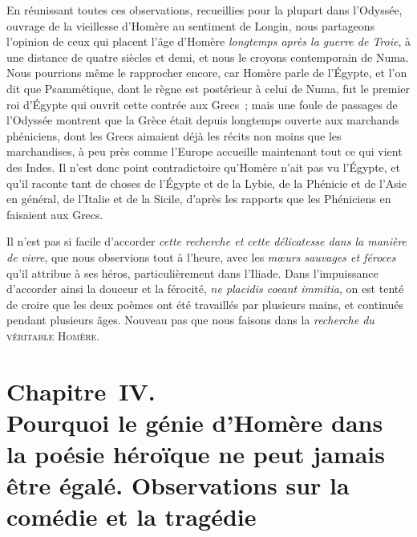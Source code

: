 \documentclass[french,twoside]{book} %
\newcommand\chapteropen{} %
\newcommand\chapterclose{} %
\begin{document}
En réunissant toutes ces observations, recueillies pour la plupart dans l’Odyssée, ouvrage de la vieillesse d’Homère au sentiment de Longin, nous partageons l’opinion de ceux qui placent l’âge d’Homère  {\itshape longtemps après la guerre de Troie}, à une distance de quatre siècles et demi, et nous le croyons contemporain de Numa. Nous pourrions même le rapprocher encore, car Homère parle de l’Égypte, et l’on dit que Psammétique, dont le règne est postérieur à celui de Numa, fut le premier roi d’Égypte qui ouvrit cette contrée aux Grecs ; mais une foule de passages de l’Odyssée montrent que la Grèce était depuis longtemps ouverte aux marchands phéniciens, dont les Grecs aimaient déjà les récits non moins que les marchandises, à peu près comme l’Europe accueille maintenant tout ce qui vient des Indes. Il n’est donc point contradictoire qu’Homère n’ait pas vu l’Égypte, et qu’il raconte tant de choses de l’Égypte et de la Lybie, de la Phénicie et de l’Asie en général, de l’Italie et de la Sicile, d’après les rapports que les Phéniciens en faisaient aux Grecs.\par
Il n’est pas si facile d’accorder {\itshape cette recherche et cette délicatesse dans la manière de vivre}, que nous observions tout à l’heure, avec les {\itshape mœurs sauvages et féroces} qu’il attribue à ses héros, particulièrement dans l’Iliade. Dans l’impuissance d’accorder ainsi la douceur et la férocité, {\itshape ne placidis coeant immitia}, on est tenté de croire que les deux poèmes ont été travaillés par plusieurs mains, et continués pendant plusieurs âges. Nouveau pas que nous faisons dans la {\itshape recherche du} {\scshape véritable Homère}.
\chapterclose


\chapteropen
\chapter[{Chapitre IV. Pourquoi le génie d’Homère dans la poésie héroïque ne peut jamais être égalé. Observations sur la comédie et la tragédie}]{Chapitre IV. \\
Pourquoi le génie d’Homère dans la poésie héroïque ne peut jamais être égalé. Observations sur la comédie et la tragédie}
\end{document}
